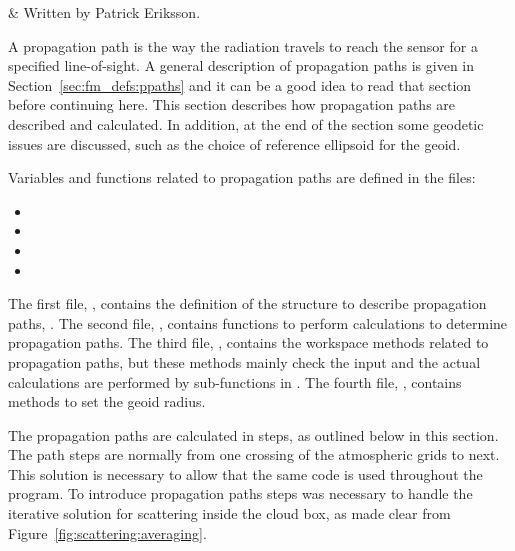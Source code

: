  \label{sec:ppath}


 & Written by Patrick Eriksson.\\
\stophistory



A propagation path is the way the radiation travels to reach the
sensor for a specified line-of-sight. A general description of
propagation paths is given in Section~\ref{sec:fm_defs:ppaths} and it
can be a good idea to read that section before continuing here. This
section describes how propagation paths are described and calculated.
In addition, at the end of the section some geodetic issues are
discussed, such as the choice of reference ellipsoid for the geoid.


Variables and functions related to propagation paths are defined in the files:
\begin{itemize}
\item {}
\item {}
\item {}
\item {}
\end{itemize}
The first file, , contains the definition of the
structure to describe propagation paths, . The
second file, , contains functions to perform
calculations to determine propagation paths. The third file,
, contains the workspace methods related to
propagation paths, but these methods mainly check the input and the
actual calculations are performed by sub-functions in
. The fourth file, ,
contains methods to set the geoid radius.




\label{sec:ppath:approach}

The propagation paths are calculated in steps, as outlined below in
this section. The path steps are normally from one crossing of the
atmospheric grids to next. This solution is necessary to allow that
the same code is used throughout the program. To introduce propagation
paths steps was necessary to handle the iterative solution for
scattering inside the cloud box, as made clear from
Figure~\ref{fig:scattering:averaging}.

